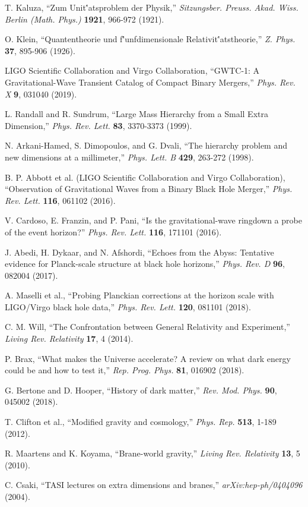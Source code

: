 \documentclass[10pt]{article}
\begin{document}
\begin{thebibliography}{99}

 T. Kaluza, ``Zum Unit\''atsproblem der Physik,'' \textit{Sitzungsber. Preuss. Akad. Wiss. Berlin (Math. Phys.)} \textbf{1921}, 966-972 (1921).

 O. Klein, ``Quantentheorie und f\''unfdimensionale Relativit\''atstheorie,'' \textit{Z. Phys.} \textbf{37}, 895-906 (1926).

 LIGO Scientific Collaboration and Virgo Collaboration, ``GWTC-1: A Gravitational-Wave Transient Catalog of Compact Binary Mergers,'' \textit{Phys. Rev. X} \textbf{9}, 031040 (2019).

 L. Randall and R. Sundrum, ``Large Mass Hierarchy from a Small Extra Dimension,'' \textit{Phys. Rev. Lett.} \textbf{83}, 3370-3373 (1999).

 N. Arkani-Hamed, S. Dimopoulos, and G. Dvali, ``The hierarchy problem and new dimensions at a millimeter,'' \textit{Phys. Lett. B} \textbf{429}, 263-272 (1998).

 B. P. Abbott et al. (LIGO Scientific Collaboration and Virgo Collaboration), ``Observation of Gravitational Waves from a Binary Black Hole Merger,'' \textit{Phys. Rev. Lett.} \textbf{116}, 061102 (2016).

 V. Cardoso, E. Franzin, and P. Pani, ``Is the gravitational-wave ringdown a probe of the event horizon?'' \textit{Phys. Rev. Lett.} \textbf{116}, 171101 (2016).

 J. Abedi, H. Dykaar, and N. Afshordi, ``Echoes from the Abyss: Tentative evidence for Planck-scale structure at black hole horizons,'' \textit{Phys. Rev. D} \textbf{96}, 082004 (2017).

 A. Maselli et al., ``Probing Planckian corrections at the horizon scale with LIGO/Virgo black hole data,'' \textit{Phys. Rev. Lett.} \textbf{120}, 081101 (2018).

 C. M. Will, ``The Confrontation between General Relativity and Experiment,'' \textit{Living Rev. Relativity} \textbf{17}, 4 (2014).

 P. Brax, ``What makes the Universe accelerate? A review on what dark energy could be and how to test it,'' \textit{Rep. Prog. Phys.} \textbf{81}, 016902 (2018).

 G. Bertone and D. Hooper, ``History of dark matter,'' \textit{Rev. Mod. Phys.} \textbf{90}, 045002 (2018).

 T. Clifton et al., ``Modified gravity and cosmology,'' \textit{Phys. Rep.} \textbf{513}, 1-189 (2012).

 R. Maartens and K. Koyama, ``Brane-world gravity,'' \textit{Living Rev. Relativity} \textbf{13}, 5 (2010).

 C. Csaki, ``TASI lectures on extra dimensions and branes,'' \textit{arXiv:hep-ph/0404096} (2004).

\end{thebibliography}
\end{document}
